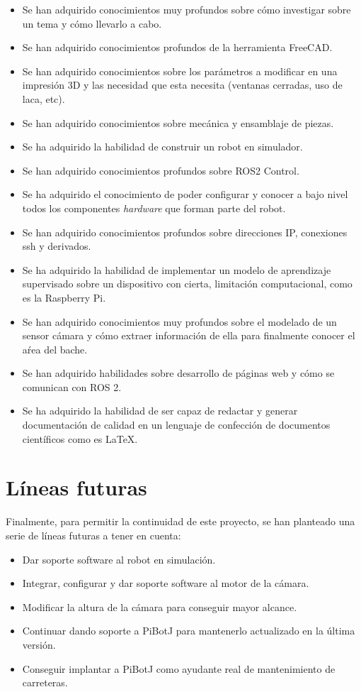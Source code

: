 \begin{itemize}
	\item Se han adquirido conocimientos muy profundos sobre cómo investigar sobre un tema y cómo llevarlo a cabo.
	\item Se han adquirido conocimientos profundos de la herramienta FreeCAD.
	\item Se han adquirido conocimientos sobre los parámetros a modificar en una impresión 3D y las necesidad que esta necesita (ventanas cerradas, uso de laca, etc).
	\item Se han adquirido conocimientos sobre mecánica y ensamblaje de piezas. 
	\item Se ha adquirido la habilidad de construir un robot en simulador.
	\item Se han adquirido conocimientos profundos sobre ROS2 Control.
	\item Se ha adquirido el conocimiento de poder configurar y conocer a bajo nivel todos los componentes \textit{hardware} que forman parte del robot.
	\item Se han adquirido conocimientos profundos sobre direcciones IP, conexiones ssh y derivados.
	\item Se ha adquirido la habilidad de implementar un modelo de aprendizaje supervisado sobre un dispositivo con cierta, limitación computacional, como es la Raspberry Pi. 
	\item Se han adquirido conocimientos muy profundos sobre el modelado de un sensor cámara y cómo extraer información de ella para finalmente conocer el aŕea del bache. 
	\item Se han adquirido habilidades sobre desarrollo de páginas web y cómo se comunican con ROS 2.
	\item Se ha adquirido la habilidad de ser capaz de redactar y generar documentación de calidad en un lenguaje de confección de documentos científicos como es LaTeX.
\end{itemize}
 


\section{Líneas futuras}

Finalmente, para permitir la continuidad de este proyecto, se han planteado una serie de líneas futuras a tener en cuenta: 

\begin{itemize}
	\item Dar soporte software al robot en simulación. 
	\item Integrar, configurar y dar soporte software al motor de la cámara.
	\item Modificar la altura de la cámara para conseguir mayor alcance.
	\item Continuar dando soporte a PiBotJ para mantenerlo actualizado en la última versión.
	\item Conseguir implantar a PiBotJ como ayudante real de mantenimiento de carreteras.
\end{itemize}

